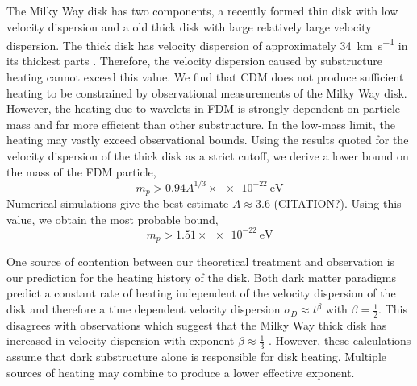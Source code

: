 \documentclass[usenatbib]{mnras}
\begin{document}
	The Milky Way disk has two components, a recently formed thin disk with low velocity dispersion and a old thick disk with large relatively large velocity dispersion. The thick disk has velocity dispersion of approximately \SI{34}{\kilo\meter\per\second} in its thickest parts \citep{milky_way}. Therefore, the velocity dispersion caused by substructure heating cannot exceed this value. We find that CDM does not produce sufficient heating to be constrained by observational measurements of the Milky Way disk. However, the heating due to wavelets in FDM is strongly dependent on particle mass and far more efficient than other substructure. In the low-mass limit, the heating may vastly exceed observational bounds. Using the results quoted for the velocity dispersion of the thick disk as a strict cutoff, we derive a lower bound on the mass of the FDM particle,
\begin{equation}
m_p > 0.94 A^{1/3} \times \SI{e-22}{\electronvolt}
\end{equation}
Numerical simulations give the best estimate $A \approx 3.6$ (CITATION?). Using this value, we obtain the most probable bound,
\[ m_p > 1.51 \times \SI{e-22}{\electronvolt} \]


\par
One source of contention between our theoretical treatment and observation is our prediction for the heating history of the disk. Both dark matter paradigms predict a constant rate of heating independent of the velocity dispersion of the disk and therefore a time dependent velocity dispersion $\sigma_D \approx t^{\beta}$ with $\beta = \tfrac{1}{2}$. This disagrees with observations which suggest that the Milky Way thick disk has increased in velocity dispersion with exponent $\beta \approx \tfrac{1}{3}$ \citep{heating_history}. However, these calculations assume that dark substructure alone is responsible for disk heating. Multiple sources of heating may combine to produce a lower effective exponent. 
\end{document}
